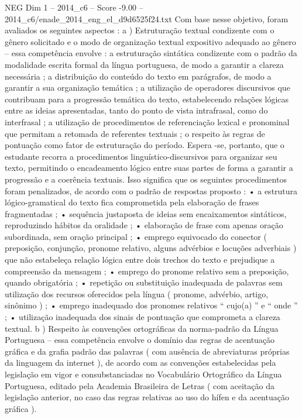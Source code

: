\begin{textsample}{NEG Dim 1 – 2014\_c6 – Score -9.00 – 2014\_c6/enade\_2014\_eng\_el\_d9d6525f24.txt}
Com base nesse objetivo, foram avaliados os seguintes aspectos : a ) Estruturação textual condizente com o gênero solicitado e o modo de organização textual expositivo adequado ao gênero – essa competência envolve : a estruturação sintática condizente com o padrão da modalidade escrita formal da língua portuguesa, de modo a garantir a clareza necessária ; a distribuição do conteúdo do texto em parágrafos, de modo a garantir a sua organização temática ; a utilização de operadores discursivos que contribuam para a progressão temática do texto, estabelecendo relações lógicas entre as ideias apresentadas, tanto do ponto de vista intrafrasal, como do interfrasal ; a utilização de procedimentos de referenciação lexical e pronominal que permitam a retomada de referentes textuais ; o respeito às regras de pontuação como fator de estruturação do período.
Espera -se, portanto, que o estudante recorra a procedimentos linguístico-discursivos para organizar seu texto, permitindo o encadeamento lógico entre suas partes de forma a garantir a progressão e a coerência textuais.
Isso significa que os seguintes procedimentos foram penalizados, de acordo com o padrão de respostas proposto : • a estrutura lógico-gramatical do texto fica comprometida pela elaboração de frases fragmentadas ; • sequência justaposta de ideias sem encaixamentos sintáticos, reproduzindo hábitos da oralidade ; • elaboração de frase com apenas oração subordinada, sem oração principal ; • emprego equivocado do conector ( preposição, conjunção, pronome relativo, alguns advérbios e locuções adverbiais ) que não estabeleça relação lógica entre dois trechos do texto e prejudique a compreensão da mensagem ; • emprego do pronome relativo sem a preposição, quando obrigatória ; • repetição ou substituição inadequada de palavras sem utilização dos recursos oferecidos pela língua ( pronome, advérbio, artigo, sinônimo ) ; • emprego inadequado dos pronomes relativos “ cujo(a) ” e “ onde ” ; • utilização inadequada dos sinais de pontuação que comprometa a clareza textual. b ) Respeito às convenções ortográficas da norma-padrão da Língua Portuguesa – essa competência envolve o domínio das regras de acentuação gráfica e da grafia padrão das palavras ( com ausência de abreviaturas próprias da linguagem da internet ), de acordo com as convenções estabelecidas pela legislação em vigor e consubstanciadas no Vocabulário Ortográfico da Língua Portuguesa, editado pela Academia Brasileira de Letras ( com aceitação da legislação anterior, no caso das regras relativas ao uso do hífen e da acentuação gráfica ).

\end{textsample}
